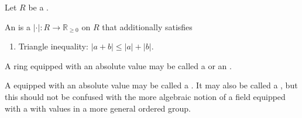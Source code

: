\begin{definition} \label{definition:absolute_value_on_a_ring}
    Let $R$ be a .

    An  is a  $|\cdot|: R \to \mathbb{R}_{\geq 0}$ on $R$ that additionally satisfies
    \begin{enumerate}
        \item Triangle inequality: $|a + b| \leq |a| + |b|$.
    \end{enumerate}





    A ring equipped with an absolute value may be called a  or an .

    A  equipped with an absolute value may be called a . It may also be called a , but this should not be confused with the more algebraic notion of a field equipped with a  with values in a more general ordered group.
\end{definition}